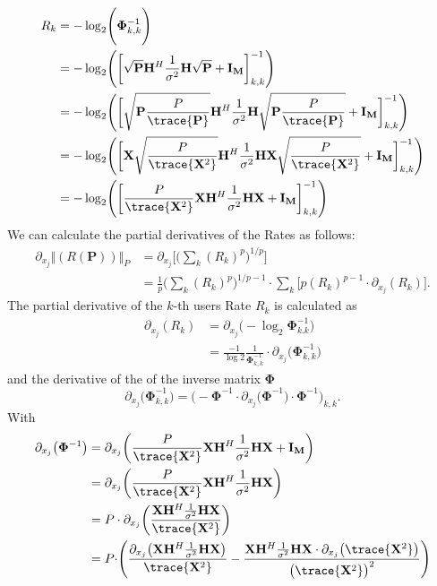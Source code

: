 \begin{align}
	R_k &= -\log_2\Biggr(\mathbf{\Phi}_{k,k}^{-1}\Biggl)\\
	&= -\log_2\Biggr(\biggr[ \sqrt{\mathbf{P}}\mathbf{H}^H\frac{1}{\sigma^2}\mathbf{H}\sqrt{\mathbf{P}} + \mathbf{I_M} \biggl]_{k,k}^{-1}\Biggl)\\
	&= -\log_2\Biggr(\biggr[ \sqrt{\mathbf{P} \frac{P}{\trace{\mathbf{P}}}}\mathbf{H}^H\frac{1}{\sigma^2}\mathbf{H} \sqrt{\mathbf{P} \frac{P}{\trace{\mathbf{P}}}} + \mathbf{I_M} \biggl]_{k,k}^{-1}\Biggl)\\
	&= -\log_2\Biggr(\biggr[ \mathbf{X} \sqrt{\frac{P}{\trace{\mathbf{X}^2}}} \mathbf{H}^H\frac{1}{\sigma^2}\mathbf{H} \mathbf{X} \sqrt{\frac{P}{\trace{\mathbf{X}^2}}} + \mathbf{I_M} \biggl]_{k,k}^{-1}\Biggl)\\
	&= -\log_2\Biggr(\biggr[\frac{P}{\trace{\mathbf{X}^2}} \mathbf{X}\mathbf{H}^H\frac{1}{\sigma^2}\mathbf{H} \mathbf{X} + \mathbf{I_M} \biggl]_{k,k}^{-1}\Biggl)
\end{align}
We can calculate the partial derivatives of the Rates as follows:
\begin{align}
	\partial_{x_j} \bigr\Vert{(R(\mathbf{P}))\bigl\Vert}_P
	&=\partial_{x_j}\Biggr[\Biggr(\sum_k{(R_k)^p}\Biggl)^{1/p}\Biggl]\\
	&=\frac{1}{p}\Biggr(\sum_k{(R_k)^p}\Biggl)^{1/p-1} \cdot \sum_k{\Biggr[p(R_k)^{p-1} \cdot \partial_{x_j}(R_k)\Biggl]}.
\end{align}
The partial derivative of the $k$-th users Rate $R_k$ is calculated as
\begin{align}
	\partial_{x_j}(R_k) &= \partial_{x_j}\bigr(-\log_2{\mathbf{\Phi}_{k.k}^{-1}}\bigl)\\
	&=\frac{-1}{\log{2}}\frac{1}{\mathbf{\Phi}_{k,k}^{-1}} \cdot \partial_{x_j}\bigr(\mathbf{\Phi}_{k,k}^{-1}\bigl)
\end{align}
and the derivative of the of the inverse matrix $\mathbf{\Phi}$
\begin{equation}
	\partial_{x_j}\bigr(\mathbf{\Phi}_{k,k}^{-1}\bigl) = \Biggr(-\mathbf{\Phi}^{-1} \cdot \partial_{x_j}\bigr(\mathbf{\Phi}^{-1}\bigl) \cdot \mathbf{\Phi}^{-1}\Biggl)_{k,k}.
\end{equation}
With
\begin{align}
	\partial_{x_j}\bigr(\mathbf{\Phi}^{-1}\bigl) &= \partial_{x_j} \biggr(\frac{P}{\trace{\mathbf{X}^2}} \mathbf{X}\mathbf{H}^H\frac{1}{\sigma^2}\mathbf{H} \mathbf{X} + \mathbf{I_M} \biggl)\\
	&= \partial_{x_j} \biggr(\frac{P}{\trace{\mathbf{X}^2}} \mathbf{X}\mathbf{H}^H\frac{1}{\sigma^2}\mathbf{H} \mathbf{X}\biggl)\\
	&= P \cdot \partial_{x_j} \biggr(\frac{ \mathbf{X}\mathbf{H}^H\frac{1}{\sigma^2}\mathbf{H} \mathbf{X} }{\trace{\mathbf{X}^2}}\biggl)\\
	&= P \cdot \Biggr(\frac{\partial_{x_j}\bigr(\mathbf{X}\mathbf{H}^H\frac{1}{\sigma^2}\mathbf{H}\mathbf{X}\bigl)}{\trace{\mathbf{X}^2}} - \frac{\mathbf{X}\mathbf{H}^H\frac{1}{\sigma^2}\mathbf{H}\mathbf{X} \cdot \partial_{x_j}\bigr(\trace{\mathbf{X}^2}\bigl)}{\bigr(\trace{\mathbf{X}^2}\bigl)^2}\Biggl)\\
\end{align}
